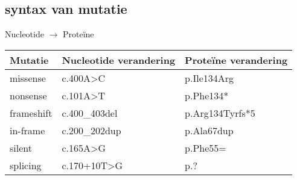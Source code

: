 \documentclass{beamer}
\begin{document}
\subsection{syntax van mutatie}
\begin{frame}{Nucleotide $\rightarrow$ Prote\"ine}
	\begin{tabular}{*3l}
		\toprule
		Mutatie & Nucleotide verandering & Prote\"ine verandering\\
		\midrule
		missense  & c.400A>C & p.Ile134Arg\\
		nonsense  & c.101A>T & p.Phe134*\\
		frameshift& c.400\_403del & p.Arg134Tyrfs*5\\
		in-frame  & c.200\_202dup & p.Ala67dup\\
		silent    & c.165A>G & p.Phe55=\\
		splicing  & c.170+10T>G & p.?\\
		\bottomrule
	\end{tabular}
\end{frame}

{\aauwavesbg
\begin{frame}
\end{frame}
}
\end{document}
